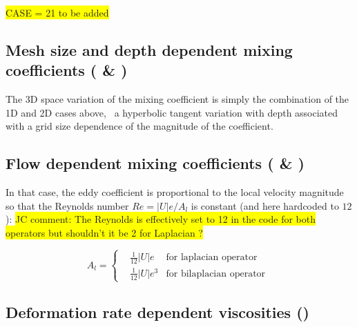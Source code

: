 \documentclass[../main/NEMO_manual]{subfiles}
\begin{document}
\colorbox{yellow}{CASE  = 21 to be added}

\subsection[Mesh size and depth dependent mixing coefficients (\forcode{=30})]{Mesh size and depth dependent mixing coefficients (\protect{} \& \protect{})}

The 3D space variation of the mixing coefficient is simply the combination of the 1D and 2D cases above,
\ie\ a hyperbolic tangent variation with depth associated with a grid size dependence of
the magnitude of the coefficient.

\subsection[Velocity dependent mixing coefficients (\forcode{=31})]{Flow dependent mixing coefficients (\protect{} \& \protect{})}
In that case, the eddy coefficient is proportional to the local velocity magnitude so that the Reynolds number $Re =  \lvert U \rvert  e / A_l$ is constant (and here hardcoded to $12$):
\colorbox{yellow}{JC comment: The Reynolds is effectively set to 12 in the code for both operators but shouldn't it be 2 for Laplacian ?}

\begin{equation}
  \label{eq:LDF_flowah}
  A_l = \left\{
    \begin{aligned}
      & \frac{1}{12} \lvert U \rvert e  			& \text{for laplacian operator } \\
      & \frac{1}{12} \lvert U \rvert e^3 		        & \text{for bilaplacian operator }
    \end{aligned}
  \right.
\end{equation}

\subsection[Deformation rate dependent viscosities (\forcode{nn_ahm_ijk_t=32})]{Deformation rate dependent viscosities (\protect{})}
\end{document}
